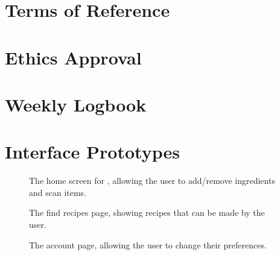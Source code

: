 \documentclass[11pt, twoside, a4paper]{report}
\newcommand*\cleartoleftpage{%
  \clearpage
  \ifodd\value{page}\hbox{}\newpage\fi
}
\begin{document}
\section{Terms of Reference}


\section{Ethics Approval}\label{sec:ethics_approval}


\section{Weekly Logbook}
\raggedbottom{}

\flushbottom{}



\cleartoleftpage\section{Interface Prototypes}
\begin{figure}
    \centering
    
    \caption{The home screen for \chef{}, allowing the user to add/remove ingredients and scan items.}
\end{figure}

\begin{figure}
    \centering
    
    \caption{The find recipes page, showing recipes that can be made by the user. }
\end{figure}

\begin{figure}
    \centering
    
    \caption{The account page, allowing the user to change their preferences.}
\end{figure}
\end{document}
